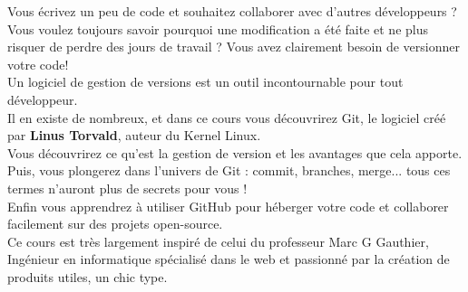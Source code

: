 Vous écrivez un peu de code et souhaitez collaborer avec d'autres développeurs ? Vous voulez toujours savoir pourquoi une modification a été faite et ne plus risquer de perdre des jours de travail ? Vous avez clairement besoin de versionner votre code! \\

Un logiciel de gestion de versions est un outil incontournable pour tout développeur. \\

Il en existe de nombreux, et dans ce cours vous découvrirez Git, le logiciel créé par \textbf{Linus Torvald}, auteur du Kernel Linux.\\

Vous découvrirez ce qu'est la gestion de version et les avantages que cela apporte. \\

Puis, vous plongerez dans l'univers de Git : commit, branches, merge... tous ces termes n'auront plus de secrets pour vous ! \\

Enfin vous apprendrez à utiliser GitHub pour héberger votre code et collaborer facilement sur des projets open-source.\\

Ce cours est très largement inspiré de celui du professeur Marc G Gauthier, Ingénieur en informatique spécialisé dans le web et passionné par la création de produits utiles, un chic type.\\

